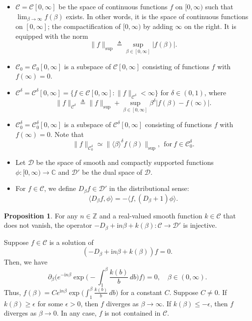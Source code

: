 \documentclass[11pt]{article}
\makeatletter
\renewenvironment{proof}[1][\proofname]{\par
  \vspace{-.7\topsep}%
  \pushQED{\qed}%
  \normalfont
  \topsep0pt \partopsep0pt %
  \trivlist
  \item[\hskip\labelsep
        \itshape
    #1\@addpunct{.}]\ignorespaces
}{%
  \popQED\endtrivlist\@endpefalse
  \addvspace{6pt plus 6pt} %
}
\theoremstyle{definition}
\newtheorem{prop}[theorem]{Proposition}
\theoremstyle{remark}
\numberwithin{equation}{section}
\newcommand{\mbb}{\mathbb}
\newcommand{\mcal}{\mathcal}
\newcommand{\Z}{\mbb{Z}}
\newcommand{\C}{\mbb{C}}
\newcommand{\del}{\partial}
\newcommand{\norm}[1]{\lVert #1 \rVert}
\makeatother
\begin{document}
\vspace{-.5em}\begin{itemize}
    \item $\mcal{C} = \mcal{C}[0,\infty]$ be the space of continuous functions $f$ on $[0,\infty)$ such that $\lim_{\beta\to \infty} f(\beta)$ exists. In other words, it is the space of continuous functions on $[0,\infty]$; the compactification of $[0,\infty)$ by adding $\infty$ on the right. It is equipped with the norm
    \[\norm{f}_{\sup} \triangleq \sup_{\beta \in [0,\infty]} |f(\beta)|.\]
    \item $\mcal{C}_0 = \mcal{C}_0[0,\infty]$ is a subspace of $\mcal{C}[0,\infty]$ consisting of functions $f$ with $f(\infty) = 0$.
    \item $\mcal{C}^\delta = \mcal{C}^\delta[0,\infty] = \{ f \in \mcal{C}[0,\infty] : \norm{f}_{\mcal{C}^\delta} < \infty \}$ for $\delta \in (0,1)$, where
    \[ \norm{f}_{\mcal{C}^\delta} \triangleq \norm{f}_{\sup} + \sup_{\beta\in [0,\infty]} \beta^\delta |f(\beta) - f(\infty)|.\]
    \item $\mcal{C}^\delta_0 = \mcal{C}^\delta_0[0,\infty]$ is a subspace of $\mcal{C}^\delta[0,\infty]$ consisting of functions $f$ with $f(\infty) = 0$. Note that
    \[\norm{f}_{\mcal{C}^\delta_0} \simeq \norm{\langle \beta \rangle^\delta f(\beta)}_{\sup},~~\text{for}~ f\in \mcal{C}^\delta_0.\]
    \item Let $\mcal{D}$ be the space of smooth and compactly supported functions $\phi : [0,\infty) \to \C$ and $\mcal{D}'$ be the dual space of $\mcal{D}$.
    \item For $f\in \mcal{C}$, we define $D_\beta f \in \mcal{D}'$ in the distributional sense:
    \begin{equation} \label{eq:3.1}
    	\langle D_\beta f, \phi \rangle = - \langle f, (D_\beta + 1)\phi \rangle.
    \end{equation}
\end{itemize}

\begin{prop} \label{prop:3.1}
For any $n\in\Z$ and a real-valued smooth function $k \in \mcal{C}$ that does not vanish, the operator $-D_\beta + \textrm{i}n \beta + k(\beta): \mcal{C}\to \mcal{D}'$ is injective.
\end{prop}
\begin{proof}
Suppose $f \in \mcal{C}$ is a solution of 
\[(-D_\beta + \textrm{i}n \beta + k(\beta)) f = 0.\]
Then, we have
\[\del_\beta \bigg(e^{-\textrm{i}n \beta} \exp \bigg(-\int_1^\beta \frac{k(b)}{b} \,db \bigg) f \bigg) = 0, \quad \beta \in (0,\infty).\]
Thus, $f(\beta) = C e^{\textrm{i}n \beta} \exp \big(\int_1^\beta \frac{k(b)}{b} \,db \big)$ for a constant $C$. Suppose $C \neq 0$. If $k(\beta) \geq \epsilon$ for some $\epsilon > 0$, then $f$ diverges as $\beta \to \infty$. If $k(\beta) \leq - \epsilon$, then $f$ diverges as $\beta \to 0$. In any case, $f$ is not contained in $\mcal{C}$.
\end{proof}
\end{document}
